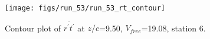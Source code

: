 \begin{figure}[H]
\centering
\texttt{[image: figs/run\_53/run\_53\_rt\_contour]}
\caption{Contour plot of $\overline{r^\prime t^\prime}$ at $z/c$=9.50, $V_{free}$=19.08, station 6.}
\end{figure}


